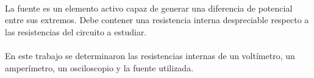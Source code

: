 \paragraph{} La fuente es un elemento activo capaz de generar una diferencia de potencial entre sus extremos. Debe contener una resistencia interna despreciable respecto a las resistencias del circuito a estudiar.


\paragraph{}
En este trabajo se determinaron las resistencias internas de un voltímetro, un amperímetro, un osciloscopio y la fuente utilizada.




